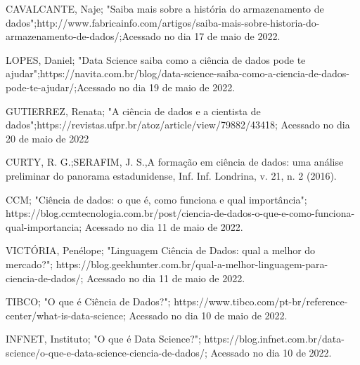 \documentclass[12pt]{article}
\begin{document}
CAVALCANTE, Naje; "Saiba mais sobre a história do armazenamento de dados";http://www.fabricainfo.com/artigos/saiba-mais-sobre-historia-do-armazenamento-de-dados/;Acessado no dia 17 de maio de 2022.

LOPES, Daniel; "Data Science saiba como a ciência de dados pode te ajudar";https://navita.com.br/blog/data-science-saiba-como-a-ciencia-de-dados-pode-te-ajudar/;Acessado no dia 19 de maio de 2022.

GUTIERREZ, Renata; "A ciência de dados e a cientista de dados";https://revistas.ufpr.br/atoz/article/view/79882/43418;
Acessado no dia 20 de maio de 2022

CURTY, R. G.;SERAFIM, J. S.,A formação em ciência de dados: uma análise preliminar do panorama estadunidense, Inf. Inf. Londrina,  v. 21, n. 2 (2016).

CCM; "Ciência de dados: o que é, como funciona e qual importância"; https://blog.ccmtecnologia.com.br/post/ciencia-de-dados-o-que-e-como-funciona-qual-importancia; Acessado no dia 11 de maio de 2022.

VICTÓRIA, Penélope; "Linguagem Ciência de Dados: qual a melhor do mercado?"; https://blog.geekhunter.com.br/qual-a-melhor-linguagem-para-ciencia-de-dados/; Acessado no dia 11 de maio de 2022.

TIBCO; "O que é Ciência de Dados?"; https://www.tibco.com/pt-br/reference-center/what-is-data-science; Acessado no dia 10 de maio de 2022.

INFNET, Instituto; "O que é Data Science?"; https://blog.infnet.com.br/data-science/o-que-e-data-science-ciencia-de-dados/; Acessado no dia 10 de 2022.
\end{document}
